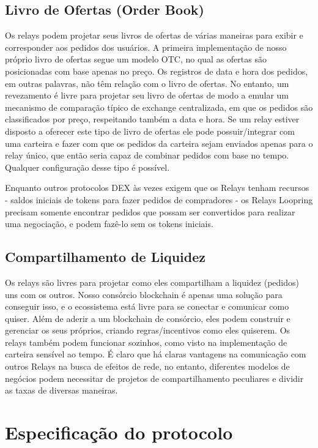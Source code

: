 \documentclass[UTF8,nofonts]{article}
\begin{document}
\begin{multicols}{2}
\subsection{Livro de Ofertas (Order Book)\label{sec:order_book}}
Os relays podem projetar seus livros de ofertas de várias maneiras para exibir e corresponder aos pedidos dos usuários. A primeira implementação de nosso próprio livro de ofertas segue um modelo OTC, no qual as ofertas são posicionadas com base apenas no preço. Os registros de data e hora dos pedidos, em outras palavras, não têm relação com o livro de ofertas.
No entanto, um revezamento é livre para projetar seu livro de ofertas de modo a emular um mecanismo de comparação típico de exchange centralizada, em que os pedidos são classificados por preço, respeitando também a data e hora. Se um relay estiver disposto a oferecer este tipo de livro de ofertas ele pode possuir/integrar com uma carteira e fazer com que os pedidos da carteira sejam enviados apenas para o relay único, que então seria capaz de combinar pedidos com base no tempo. Qualquer configuração desse tipo é possível.


Enquanto outros protocolos DEX às vezes exigem que os Relays tenham recursos - saldos iniciais de tokens para fazer pedidos de compradores - os Relays Loopring precisam somente encontrar pedidos que possam ser convertidos para realizar uma negociação, e podem fazê-lo sem os tokens iniciais.

\subsection{Compartilhamento de Liquidez\label{sec:liquidity_sharing}}
Os relays são livres para projetar como eles compartilham a liquidez (pedidos) uns com os outros. Nosso consórcio blockchain é apenas uma solução para conseguir isso, e o ecossistema está livre para se conectar e comunicar como quiser. Além de aderir a um blockchain de consórcio, eles podem construir e gerenciar os seus próprios, criando regras/incentivos como eles quiserem. Os relays também podem funcionar sozinhos, como visto na implementação de carteira sensível ao tempo. É claro que há claras vantagens na comunicação com outros Relays na busca de efeitos de rede, no entanto, diferentes modelos de negócios podem necessitar de projetos de compartilhamento peculiares e dividir as taxas de diversas maneiras.


\section{Especificação do protocolo\label{sec:protocol}}


\end{multicols}
\end{document}
